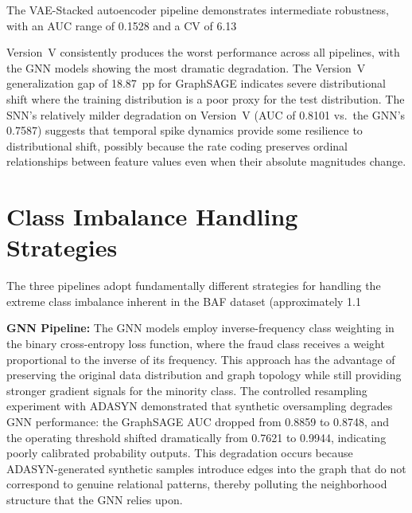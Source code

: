 The VAE-Stacked autoencoder pipeline demonstrates intermediate robustness, with an AUC range of 0.1528 and a CV of 6.13%

Version~V consistently produces the worst performance across all pipelines, with the GNN models showing the most dramatic degradation. The Version~V generalization gap of 18.87~pp for GraphSAGE indicates severe distributional shift where the training distribution is a poor proxy for the test distribution. The SNN's relatively milder degradation on Version~V (AUC of 0.8101 vs.\ the GNN's 0.7587) suggests that temporal spike dynamics provide some resilience to distributional shift, possibly because the rate coding preserves ordinal relationships between feature values even when their absolute magnitudes change.

\section{Class Imbalance Handling Strategies}

The three pipelines adopt fundamentally different strategies for handling the extreme class imbalance inherent in the BAF dataset (approximately 1.1%

\textbf{GNN Pipeline:} The GNN models employ inverse-frequency class weighting in the binary cross-entropy loss function, where the fraud class receives a weight proportional to the inverse of its frequency. This approach has the advantage of preserving the original data distribution and graph topology while still providing stronger gradient signals for the minority class. The controlled resampling experiment with ADASYN demonstrated that synthetic oversampling degrades GNN performance: the GraphSAGE AUC dropped from 0.8859 to 0.8748, and the operating threshold shifted dramatically from 0.7621 to 0.9944, indicating poorly calibrated probability outputs. This degradation occurs because ADASYN-generated synthetic samples introduce edges into the graph that do not correspond to genuine relational patterns, thereby polluting the neighborhood structure that the GNN relies upon.

